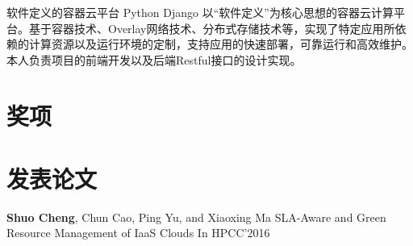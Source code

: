 \documentclass[11pt,a4paper]{moderncv}
\begin{document}
\vspace*{0.2\baselineskip}
{软件定义的容器云平台}
{Python}
{Django}{}
{以“软件定义”为核心思想的容器云计算平台。基于容器技术、Overlay网络技术、分布式存储技术等，实现了特定应用所依赖的计算资源以及运行环境的定制，支持应用的快速部署，可靠运行和高效维护。本人负责项目的前端开发以及后端Restful接口的设计实现。}

\vspace*{0.2\baselineskip}


\section{奖项}


\section{发表论文}
{\textbf{Shuo Cheng}\textnormal{, Chun Cao, Ping Yu, and Xiaoxing Ma}}
{ SLA-Aware and Green Resource Management of IaaS Clouds}
{ In HPCC'2016}{}{}



\closesection{}                   %
\renewcommand{\listitemsymbol}{-} %
\end{document}
